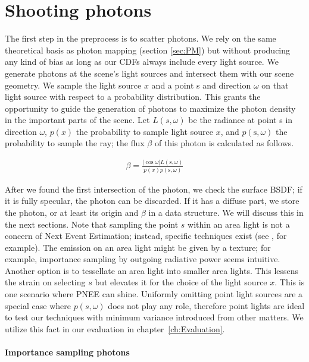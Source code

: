 \section{Shooting photons}
\label{ch:shootph}
The first step in the preprocess is to scatter photons. We rely on the same theoretical basis as photon mapping (section \ref{sec:PM}) but without producing any kind of bias as long as our CDFs always include every light source. We generate photons at the scene's light sources and intersect them with our scene geometry. We sample the light source $x$ and a point s and direction $\omega$ on that light source with respect to a probability distribution. This grants the opportunity to guide the generation of photons to maximize the photon density in the important parts of the scene. Let $L(s,\omega)$ be the radiance at point s in direction $\omega$, $p(x)$ the probability to sample light source $x$, and $p(\text{s}, \omega)$ the probability to sample the ray; the flux $\beta$ of this photon is calculated as follows.

\begin{align}\label{eq:beta}
\beta = \frac{|\cos{\omega}|L(\text{s}, \omega)}{p(x)p(\text{s}, \omega)}
\end{align}

 After we found the first intersection of the photon, we check the surface BSDF; if it is fully specular, the photon can be discarded. If it has a diffuse part, we store the photon, or at least its origin and $\beta$ in a data structure. We will discuss this in the next sections. Note that sampling the point $s$ within an area light is not a concern of Next Event Estimation; instead, specific techniques exist (see \parencite{Shirley:1996:MCT:226150.226151, DBLP:journals/cgf/UrenaFK13, DBLP:journals/corr/abs-1805-09048, DBLP:journals/cgf/KokJ92}, for example). The emission on an area light might be given by a texture; for example, importance sampling by outgoing radiative power seems intuitive. Another option is to tessellate an area light into smaller area lights. This lessens the strain on selecting $s$ but elevates it for the choice of the light source $x$. This is one scenario where PNEE can shine. Uniformly omitting point light sources are a special case where $p(s,\omega)$ does not play any role, therefore point lights are ideal to test our techniques with minimum variance introduced from other matters. We utilize this fact in our evaluation in chapter~\ref{ch:Evaluation}.

\paragraph{Importance sampling photons}
\label{ch:photonimportancesample}

